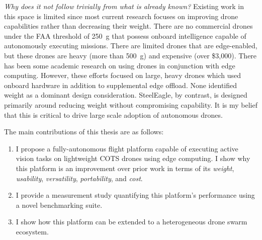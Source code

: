 \textit{Why does it not follow trivially from what is already known?} Existing work in this space is limited since most current research focuses on improving drone capabilities rather than decreasing their weight. There are no commercial drones under the FAA threshold of 250~g that possess onboard intelligence capable of autonomously executing  missions. There are limited drones that are edge-enabled, but these drones are heavy (more than 500~g) and expensive (over \$3,000).
There has been some academic research on using drones in conjunction with edge computing. However, these efforts focused on large, heavy drones which used onboard hardware in addition to supplemental edge offload. None identified weight as a dominant design consideration. SteelEagle, by contrast, is designed primarily around reducing weight without compromising capability. It is my belief that this is critical to drive large scale adoption of autonomous drones. 

\begin{flushleft}
The main contributions of this thesis are as follows:
\end{flushleft}
\begin{enumerate}
\item I propose a fully-autonomous flight platform capable of executing active vision tasks on lightweight COTS drones using edge computing. I show why this platform is an improvement over prior work in terms of its \textit{weight}, \textit{usability}, \textit{versatility}, \textit{portability}, and \textit{cost}.
\item I provide a measurement study quantifying this platform's performance using a novel benchmarking suite.
\item I show how this platform can be extended to a heterogeneous drone swarm ecosystem.  
\end{enumerate}

 

